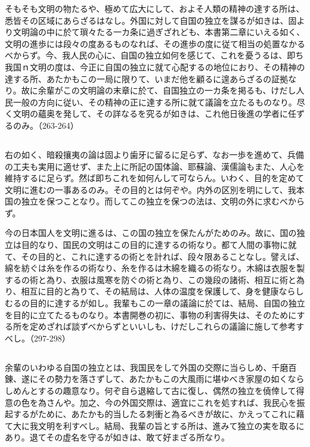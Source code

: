 そもそも文明の物たるや、極めて広大にして、およそ人類の精神の達する所は、悉皆その区域にあらざるはなし。外国に対して自国の独立を謀るが如きは、固より文明論の中に於て瑣々たる一カ条に過ぎざれども、本書第二章にいえる如く、文明の進歩には段々の度あるものなれば、その進歩の度に従て相当の処置なかるべからず。今、我人民の心に、自国の独立如何を感じて、これを憂うるは、即ち我国ｎ文明の度は、今正に自国の独立に就て心配するの地位におり、その精神の達する所、あたかもこの一局に限りて、いまだ他を顧るに遑あらざるの証拠なり。故に余輩がこの文明論の末章に於て、自国独立の一カ条を掲るも、けだし人民一般の方向に従い、その精神の正に達する所に就て議論を立たるものなり。尽く文明の蘊奥を発して、その詳なるを究るが如きは、これ他日後進の学者に任ずるのみ。（263-264）

\subsection{}




右の如く、暗殺攘夷の論は固より歯牙に留るに足らず、なお一歩を進めて、兵備の工夫も実用に適せず、また上に所記の国体論、耶蘇論、漢儒論もまた、人心を維持するに足らず。然ば即ちこれを如何んして可ならん。いわく、目的を定めて文明に進むの一事あるのみ。その目的とは何ぞや。内外の区別を明にして、我本国の独立を保つことなり。而してこの独立を保つの法は、文明の外に求むべからず。

今の日本国人を文明に進るは、この国の独立を保たんがためのみ。故に、国の独立は目的なり、国民の文明はこの目的に達するの術なり。都て人間の事物に就て、その目的と、これに達するの術とを計れば、段々限あることなし。譬えば、綿を紡ぐは糸を作るの術なり、糸を作るは木綿を織るの術なり。木綿は衣服を製するの術と為り、衣服は風寒を防ぐの術と為り、この幾段の諸術、相互に術と為り、相互に目的と為りて、その結局は、人体の温度を保護して、身を健康ならしむるの目的に達するが如し。我輩もこの一章の議論に於ては、結局、自国の独立を目的に立てたるものなり。本書開巻の初に、事物の利害得失は、そのためにする所を定めざれば談ずべからずといいしも、けだしこれらの議論に施して参考すべし。（297-298）

\subsection{}




余輩のいわゆる自国の独立とは、我国民をして外国の交際に当らしめ、千磨百錬、遂にその勢力を落さずして、あたかもこの大風雨に堪ゆべき家屋の如くならしめんとするの趣意なり。何ぞ自ら退縮して古に復し、偶然の独立を僥倖して得意の色を為さんや。加之、今の外国交際は、適宜にこれを処すれば、我民心を振起するがために、あたかも的当したる刺衝と為るべきが故に、かえってこれに藉て大に我文明を利すべし。結局、我輩の旨とする所は、進みて独立の実を取るにあり。退てその虚名を守るが如きは、敢て好まざる所なり。

